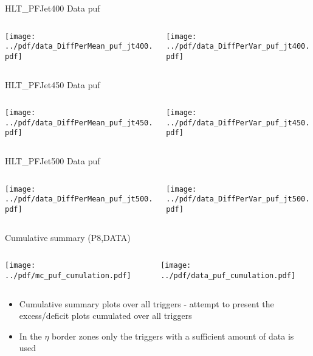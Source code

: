 \documentclass[9pt]{beamer}
\begin{document}
\begin{frame}[t]{HLT\_PFJet400 Data puf}
\begin{columns}[T]
  \begin{column}{.5\textwidth}
  \texttt{[image: ../pdf/data\_DiffPerMean\_puf\_jt400.pdf]}
  \end{column}
  \begin{column}{.5\textwidth}
  \texttt{[image: ../pdf/data\_DiffPerVar\_puf\_jt400.pdf]}
  \end{column}
\end{columns}
\end{frame}

\begin{frame}[t]{HLT\_PFJet450 Data puf}
\begin{columns}[T]
  \begin{column}{.5\textwidth}
  \texttt{[image: ../pdf/data\_DiffPerMean\_puf\_jt450.pdf]}
  \end{column}
  \begin{column}{.5\textwidth}
  \texttt{[image: ../pdf/data\_DiffPerVar\_puf\_jt450.pdf]}
  \end{column}
\end{columns}
\end{frame}

\begin{frame}[t]{HLT\_PFJet500 Data puf}
\begin{columns}[T]
  \begin{column}{.5\textwidth}
  \texttt{[image: ../pdf/data\_DiffPerMean\_puf\_jt500.pdf]}
  \end{column}
  \begin{column}{.5\textwidth}
  \texttt{[image: ../pdf/data\_DiffPerVar\_puf\_jt500.pdf]}
  \end{column}
\end{columns}
\end{frame}

\begin{frame}[t]{Cumulative summary (P8,DATA)}
\begin{columns}[T]
  \begin{column}{.5\textwidth}
  \texttt{[image: ../pdf/mc\_puf\_cumulation.pdf]}
  \end{column}
  \begin{column}{.5\textwidth}
  \texttt{[image: ../pdf/data\_puf\_cumulation.pdf]}
  \end{column}
\end{columns}
\begin{itemize}
 \item Cumulative summary plots over all triggers - attempt to present the excess/deficit plots cumulated over all triggers
 \item In the $\eta$ border zones only the triggers with a sufficient amount of data is used
\end{itemize}
\end{frame}
\end{document}
